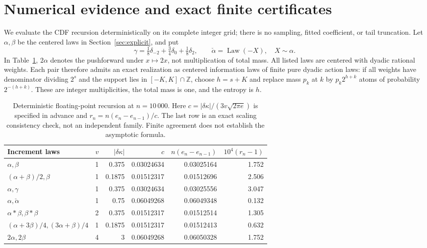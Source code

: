 \documentclass[11pt,a4paper]{article}
\numberwithin{equation}{section}
\newcommand{\Law}{\operatorname{Law}}
\begin{document}
\section{Numerical evidence and exact finite certificates}\label{sec:numerics}
We evaluate the CDF recursion deterministically on its complete integer
grid; there is no sampling, fitted coefficient, or tail truncation.
Let $\alpha,\beta$ be the centered laws in Section~\ref{sec:explicit}, and
put
\[
\gamma=\tfrac18\delta_{-2}+\tfrac34\delta_0+\tfrac18\delta_2,
\qquad \check\alpha=\Law(-X),\quad X\sim\alpha.
\]
In Table~\ref{tab:coefficient}, $2\alpha$ denotes the pushforward under
$x\mapsto2x$, not multiplication of total mass. All listed laws are
centered with dyadic rational weights. Each pair therefore admits an
exact realization as centered information laws of finite pure dyadic
action laws: if all weights have denominator dividing $2^s$ and the
support lies in $[-K,K]\cap\mathbb Z$, choose $h=s+K$ and replace mass
$p_k$ at $k$ by $p_k2^{h+k}$ atoms of probability $2^{-(h+k)}$.
These are integer multiplicities, the total mass is one, and the entropy
is $h$.

\begin{table}[H]
\centering\small
\setlength{\tabcolsep}{4pt}
\begin{tabular}{@{}lrrrrr@{}}
\toprule
Increment laws & $v$ & $|\delta\kappa|$ & $c$ & $n(e_n-e_{n-1})$ & $10^4(r_n-1)$\\
\midrule
$\alpha,\beta$ & 1 & 0.375 & 0.03024634 & 0.03025164 & 1.752 \\
$(\alpha+\beta)/2,\beta$ & 1 & 0.1875 & 0.01512317 & 0.01512696 & 2.506 \\
$\alpha,\gamma$ & 1 & 0.375 & 0.03024634 & 0.03025556 & 3.047 \\
$\alpha,\check\alpha$ & 1 & 0.75 & 0.06049268 & 0.06049348 & 0.132 \\
$\alpha*\beta,\beta*\beta$ & 2 & 0.375 & 0.01512317 & 0.01512514 & 1.305 \\
$(\alpha+3\beta)/4,(3\alpha+\beta)/4$ & 1 & 0.1875 & 0.01512317 & 0.01512413 & 0.632 \\
$2\alpha,2\beta$ & 4 & 3 & 0.06049268 & 0.06050328 & 1.752 \\
\bottomrule
\end{tabular}
\caption{Deterministic floating-point recursion at $n=10\,000$.
Here $c=|\delta\kappa|/(3v\sqrt{2\pi e})$ is specified in advance and
$r_n=n(e_n-e_{n-1})/c$. The last row is an exact scaling consistency
check, not an independent family. Finite agreement does not establish
the asymptotic formula.}\label{tab:coefficient}
\end{table}
\end{document}
